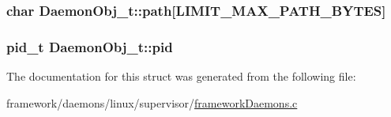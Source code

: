 \subsubsection[{\texorpdfstring{path}{path}}]{\setlength{\rightskip}{0pt plus 5cm}char Daemon\+Obj\+\_\+t\+::path\mbox{[}{\bf L\+I\+M\+I\+T\+\_\+\+M\+A\+X\+\_\+\+P\+A\+T\+H\+\_\+\+B\+Y\+T\+ES}\mbox{]}}\hypertarget{struct_daemon_obj__t_a45eaa9f5b2c13759358ef493e957f6cf}{}\label{struct_daemon_obj__t_a45eaa9f5b2c13759358ef493e957f6cf}
\subsubsection[{\texorpdfstring{pid}{pid}}]{\setlength{\rightskip}{0pt plus 5cm}pid\+\_\+t Daemon\+Obj\+\_\+t\+::pid}\hypertarget{struct_daemon_obj__t_aeef6d0a90c239a96921ff93fe013d065}{}\label{struct_daemon_obj__t_aeef6d0a90c239a96921ff93fe013d065}


The documentation for this struct was generated from the following file\+:\begin{DoxyCompactItemize}
\item 
framework/daemons/linux/supervisor/\hyperlink{framework_daemons_8c}{framework\+Daemons.\+c}\end{DoxyCompactItemize}

